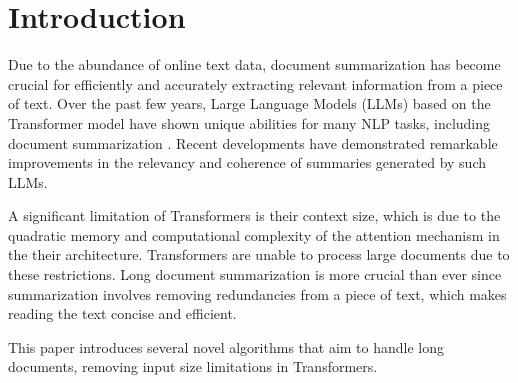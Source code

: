 \section{Introduction}
\label{sec:introduction}

Due to the abundance of online text data, document summarization has become crucial
for efficiently and accurately extracting relevant information from a piece of text.
Over the past few years, Large Language Models (LLMs) based on the Transformer model
\cite{vaswani2017attention} have shown unique abilities for many NLP tasks, including
document summarization \cite{yadav2023state}.
Recent developments have demonstrated remarkable improvements in the relevancy and
coherence of summaries generated by such LLMs.

A significant limitation of Transformers is their context size, which is due to the quadratic
memory and computational complexity of the attention mechanism in the their architecture.
Transformers are unable to process large documents due to these restrictions.
Long document summarization is more crucial than ever since summarization involves
removing redundancies from a piece of text, which makes reading the text concise and
efficient.

This paper introduces several novel algorithms that aim to handle long documents,
removing input size limitations in Transformers.
